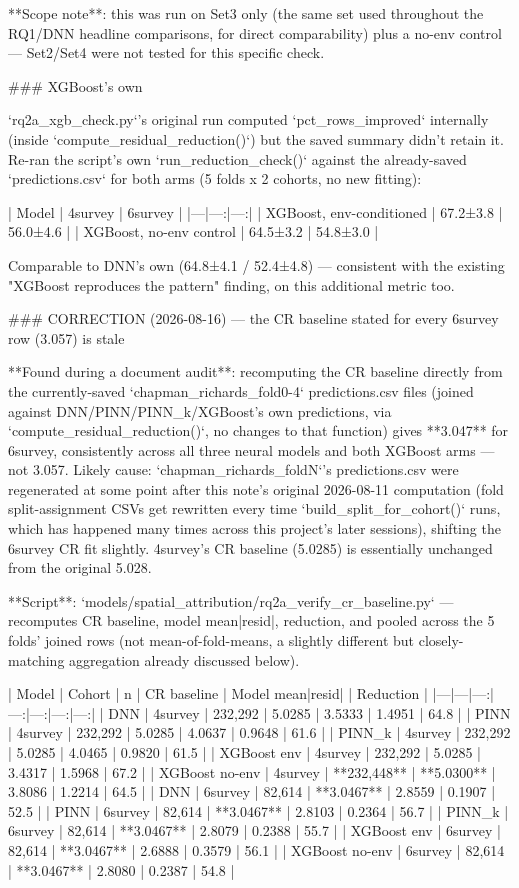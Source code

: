 **Scope note**: this was run on Set3 only (the same set used throughout the RQ1/DNN headline
comparisons, for direct comparability) plus a no-env control — Set2/Set4 were not tested for this
specific check.

### XGBoost's own %

`rq2a_xgb_check.py`'s original run computed `pct_rows_improved` internally (inside
`compute_residual_reduction()`) but the saved summary didn't retain it. Re-ran the script's own
`run_reduction_check()` against the already-saved `predictions.csv` for both arms (5 folds x 2
cohorts, no new fitting):

| Model | 4survey | 6survey |
|---|---:|---:|
| XGBoost, env-conditioned | 67.2±3.8 | 56.0±4.6 |
| XGBoost, no-env control | 64.5±3.2 | 54.8±3.0 |

Comparable to DNN's own (64.8±4.1 / 52.4±4.8) — consistent with the existing "XGBoost reproduces
the pattern" finding, on this additional metric too.

### CORRECTION (2026-08-16) — the CR baseline stated for every 6survey row (3.057) is stale

**Found during a document audit**: recomputing the CR baseline directly from the currently-saved
`chapman_richards_fold{0-4}` predictions.csv files (joined against DNN/PINN/PINN_k/XGBoost's own
predictions, via `compute_residual_reduction()`, no changes to that function) gives **3.047** for
6survey, consistently across all three neural models and both XGBoost arms — not 3.057. Likely
cause: `chapman_richards_fold{N}`'s predictions.csv were regenerated at some point after this
note's original 2026-08-11 computation (fold split-assignment CSVs get rewritten every time
`build_split_for_cohort()` runs, which has happened many times across this project's later
sessions), shifting the 6survey CR fit slightly. 4survey's CR baseline (5.0285) is essentially
unchanged from the original 5.028.

**Script**: `models/spatial_attribution/rq2a_verify_cr_baseline.py` — recomputes CR baseline,
model mean|resid|, reduction, and %
pooled across the 5 folds' joined rows (not mean-of-fold-means, a slightly different but
closely-matching aggregation already discussed below).

| Model | Cohort | n | CR baseline | Model mean|resid| | Reduction | %
|---|---|---:|---:|---:|---:|---:|
| DNN | 4survey | 232,292 | 5.0285 | 3.5333 | 1.4951 | 64.8 |
| PINN | 4survey | 232,292 | 5.0285 | 4.0637 | 0.9648 | 61.6 |
| PINN_k | 4survey | 232,292 | 5.0285 | 4.0465 | 0.9820 | 61.5 |
| XGBoost env | 4survey | 232,292 | 5.0285 | 3.4317 | 1.5968 | 67.2 |
| XGBoost no-env | 4survey | **232,448** | **5.0300** | 3.8086 | 1.2214 | 64.5 |
| DNN | 6survey | 82,614 | **3.0467** | 2.8559 | 0.1907 | 52.5 |
| PINN | 6survey | 82,614 | **3.0467** | 2.8103 | 0.2364 | 56.7 |
| PINN_k | 6survey | 82,614 | **3.0467** | 2.8079 | 0.2388 | 55.7 |
| XGBoost env | 6survey | 82,614 | **3.0467** | 2.6888 | 0.3579 | 56.1 |
| XGBoost no-env | 6survey | 82,614 | **3.0467** | 2.8080 | 0.2387 | 54.8 |

